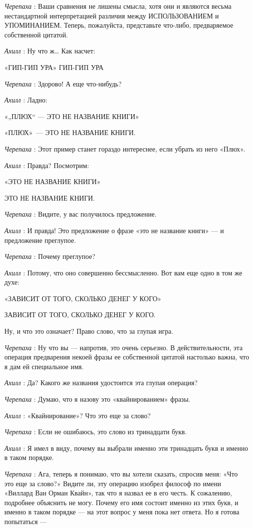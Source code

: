 \emph{Черепаха} : Ваши сравнения не лишены смысла, хотя они и являются весьма нестандартной интерпретацией различия между ИСПОЛЬЗОВАНИЕМ и УПОМИНАНИЕМ. Теперь, пожалуйста, представьте что-либо, предваряемое собственной цитатой.

\emph{Ахилл} : Ну что ж\ldots{} Как насчет:

«ГИП-ГИП УРА» ГИП-ГИП УРА

\emph{Черепаха} : Здорово! А еще что-нибудь?

\emph{Ахилл} : Ладно:

«„ПЛЮХ`` --- ЭТО НЕ НАЗВАНИЕ КНИГИ»

«ПЛЮХ»~--- ЭТО НЕ НАЗВАНИЕ КНИГИ.

\emph{Черепаха} : Этот пример станет гораздо интереснее, если убрать из него «Плюх».

\emph{Ахилл} : Правда? Посмотрим:

«ЭТО НЕ НАЗВАНИЕ КНИГИ»

ЭТО НЕ НАЗВАНИЕ КНИГИ.

\emph{Черепаха} : Видите, у вас получилось предложение.

\emph{Ахилл} : И правда! Это предложение о фразе «это не название книги» --- и предложение преглупое.

\emph{Черепаха} : Почему преглупое?

\emph{Ахилл} : Потому, что оно совершенно бессмысленно. Вот вам еще одно в том же духе:

«ЗАВИСИТ ОТ ТОГО, СКОЛЬКО ДЕНЕГ У КОГО»

ЗАВИСИТ ОТ ТОГО, СКОЛЬКО ДЕНЕГ У КОГО.

Ну, и что это означает? Право слово, что за глупая игра.

\emph{Черепаха} : Ну что вы --- напротив, это очень серьезно. В действительности, эта операция предварения некоей фразы ее собственной цитатой настолько важна, что я дам ей специальное имя.

\emph{Ахилл} : Да? Какого же названия удостоится эта глупая операция?

\emph{Черепаха} : Думаю, что я назову это «квайнированием» фразы.

\emph{Ахилл} : «Квайнирование»? Что это еще за слово?

\emph{Черепаха} : Если не ошибаюсь, это слово из тринадцати букв.

\emph{Ахилл} : Я имел в виду, почему вы выбрали именно эти тринадцать букв и именно в таком порядке.

\emph{Черепаха} : Ага, теперь я понимаю, что вы хотели сказать, спросив меня: «Что это еще за слово?» Видите ли, эту операцию изобрел философ по имени «Виллард Ван Орман Квайн», так что я назвал ее в его честь. К сожалению, подробнее объяснить не могу. Почему его имя состоит именно из этих букв, и именно в таком порядке --- на этот вопрос у меня пока нет ответа. Но я готова попытаться ---

